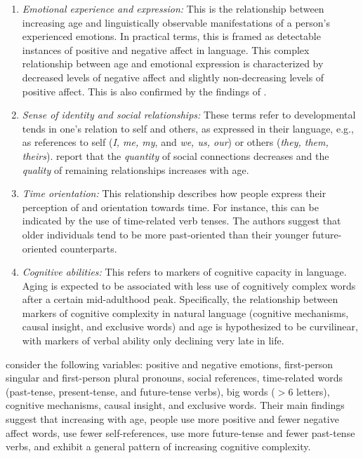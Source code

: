 \begin{enumerate}
    \item \textit{Emotional experience and expression:} This is the relationship between increasing age and linguistically observable manifestations of a person's experienced emotions. In practical terms, this is framed as detectable instances of positive and negative affect in language. This complex relationship between age and emotional expression is characterized by decreased levels of negative affect and slightly non-decreasing levels of positive affect. This is also confirmed by the findings of \cite{schler2006effects}.
    
    \item \textit{Sense of identity and social relationships:} These terms refer to developmental tends in one's relation to self and others, as expressed in their language, e.g., as references to self (\textit{I, me, my}, and \textit{we, us, our}) or others (\textit{they, them, theirs}). \cite{pennebaker2003words} report that the \textit{quantity} of social connections decreases and the \textit{quality} of remaining relationships increases with age.
    
    \item \textit{Time orientation:} This relationship describes how people express their perception of and orientation towards time. For instance, this can be indicated by the use of time-related verb tenses. The authors suggest that older individuals tend to be more past-oriented than their younger future-oriented counterparts.
    
    \item \textit{Cognitive abilities:} This refers to markers of cognitive capacity in language. Aging is expected to be associated with less use of cognitively complex words after a certain mid-adulthood peak. Specifically, the relationship between markers of cognitive complexity in natural language (cognitive mechanisms, causal insight, and exclusive words) and age is hypothesized to be curvilinear, with markers of verbal ability only declining very late in life. 
\end{enumerate}

\cite{pennebaker2003words} consider the following variables: positive and negative emotions, first-person singular and first-person plural pronouns, social references, time-related words (past-tense, present-tense, and future-tense verbs), big words ($>6$ letters), cognitive mechanisms, causal insight, and exclusive words. Their main findings suggest that increasing with age, people use more positive and fewer negative affect words, use fewer self-references, use more future-tense and fewer past-tense verbs, and exhibit a general pattern of increasing cognitive complexity.

